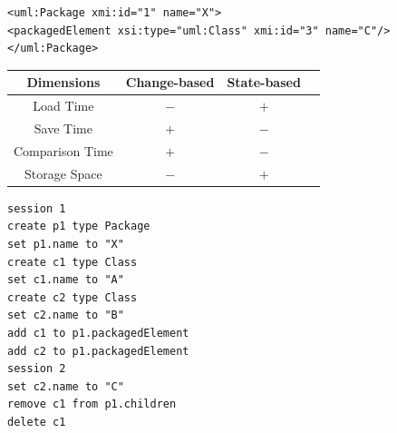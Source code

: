 \documentclass{llncs}
\begin{document}
\vspace{-15pt}
\begin{minipage}[t]{0.59\linewidth}
\begin{lstlisting}[style=xmi,caption={The second version of the UML2 example model.},label=lst:xmimodel2]
<uml:Package xmi:id="1" name="X">
<packagedElement xsi:type="uml:Class" xmi:id="3" name="C"/>
</uml:Package>
\end{lstlisting}

\centering
{}
\label{table:persistence_comparsion}
\begin{small}
\begin{tabular}{ c c c c }
    \hline 
    \textbf{Dimensions} & \textbf{Change-based} & \textbf{State-based} \\
    \hline 
    Load Time & $-$ & $+$ \\
    Save Time & $+$ & $-$ \\
    Comparison Time & $+$ & $-$ \\
    Storage Space & $-$ & $+$ \\
    \hline 
\end{tabular}
\end{small}
\end{minipage}
\hfill
\begin{minipage}[t]{0.39\linewidth}
\begin{lstlisting}[style=eol,caption={The text CBP of producing state-based model in List. \ref{lst:xmimodel2}. Its visual illustration is in Fig. \ref{fig:illustration_cbp}.},label=lst:cbpmodel]
session 1
create p1 type Package
set p1.name to "X" 
create c1 type Class
set c1.name to "A"
create c2 type Class
set c2.name to "B"
add c1 to p1.packagedElement 
add c2 to p1.packagedElement
session 2
set c2.name to "C"
remove c1 from p1.children 
delete c1
\end{lstlisting}
\end{minipage}
 
\end{document}
